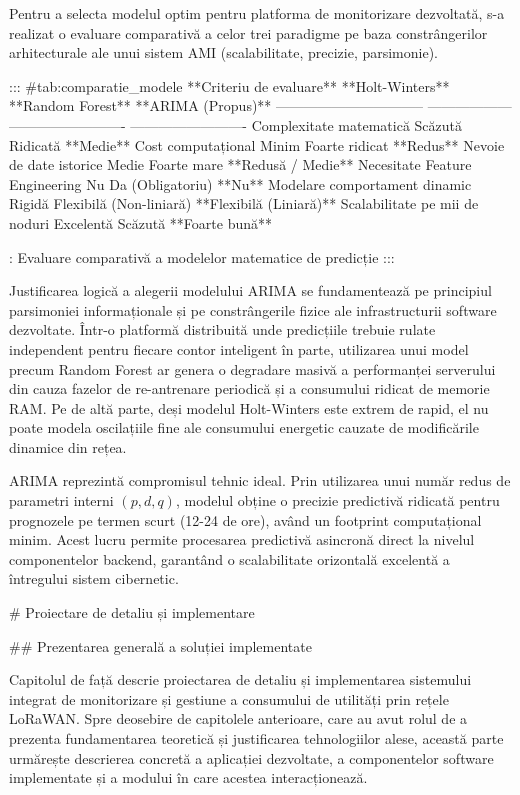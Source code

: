 Pentru a selecta modelul optim pentru platforma de monitorizare
dezvoltată, s-a realizat o evaluare comparativă a celor trei paradigme
pe baza constrângerilor arhitecturale ale unui sistem AMI
(scalabilitate, precizie, parsimonie).

::: {#tab:comparatie_modele}
  **Criteriu de evaluare**          **Holt-Winters**      **Random Forest**        **ARIMA (Propus)**
  -------------------------------- ------------------ ------------------------- -------------------------
  Complexitate matematică               Scăzută               Ridicată                  **Medie**
  Cost computațional                     Minim             Foarte ridicat               **Redus**
  Nevoie de date istorice                Medie               Foarte mare           **Redusă / Medie**
  Necesitate Feature Engineering           Nu             Da (Obligatoriu)               **Nu**
  Modelare comportament dinamic          Rigidă        Flexibilă (Non-liniară)   **Flexibilă (Liniară)**
  Scalabilitate pe mii de noduri       Excelentă               Scăzută               **Foarte bună**

  : Evaluare comparativă a modelelor matematice de predicție
:::

Justificarea logică a alegerii modelului ARIMA se fundamentează pe
principiul parsimoniei informaționale și pe constrângerile fizice ale
infrastructurii software dezvoltate. Într-o platformă distribuită unde
predicțiile trebuie rulate independent pentru fiecare contor inteligent
în parte, utilizarea unui model precum Random Forest ar genera o
degradare masivă a performanței serverului din cauza fazelor de
re-antrenare periodică și a consumului ridicat de memorie RAM. Pe de
altă parte, deși modelul Holt-Winters este extrem de rapid, el nu poate
modela oscilațiile fine ale consumului energetic cauzate de modificările
dinamice din rețea.

ARIMA reprezintă compromisul tehnic ideal. Prin utilizarea unui număr
redus de parametri interni $(p, d, q)$, modelul obține o precizie
predictivă ridicată pentru prognozele pe termen scurt (12-24 de ore),
având un footprint computațional minim. Acest lucru permite procesarea
predictivă asincronă direct la nivelul componentelor backend, garantând
o scalabilitate orizontală excelentă a întregului sistem cibernetic.

# Proiectare de detaliu și implementare

## Prezentarea generală a soluției implementate

Capitolul de față descrie proiectarea de detaliu și implementarea
sistemului integrat de monitorizare și gestiune a consumului de
utilități prin rețele LoRaWAN. Spre deosebire de capitolele anterioare,
care au avut rolul de a prezenta fundamentarea teoretică și justificarea
tehnologiilor alese, această parte urmărește descrierea concretă a
aplicației dezvoltate, a componentelor software implementate și a
modului în care acestea interacționează.

